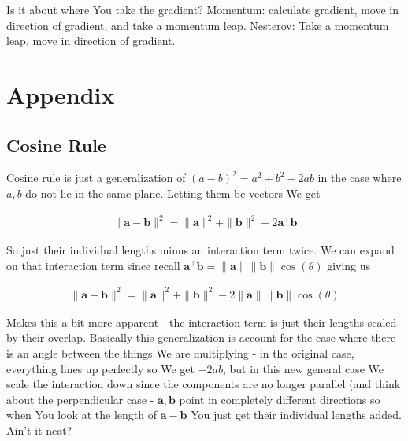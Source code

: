 \documentclass{article}
\begin{document}
		Is it about where You take the gradient? Momentum: calculate gradient, move in direction of gradient, and take a momentum leap. Nesterov: Take a momentum leap, move in direction of gradient.















		
\newpage
\section{Appendix}

	\subsection{Cosine Rule}
	
		Cosine rule is just a generalization of $(a-b)^2 = a^2 + b^2 - 2ab$ in the case where $a, b$ do not lie in the same plane. Letting them be vectors We get
		
		\begin{align*}
			\|\mathbf{a - b}\|^2 = \|\mathbf{a}\|^2 + \|\mathbf{b}\|^2 - 2\mathbf{a}^\top\mathbf{b} 
		\end{align*}
		
		So just their individual lengths minus an interaction term twice. We can expand on that interaction term since recall $\mathbf{a}^\top\mathbf{b} = \|\mathbf{a}\|\|\mathbf{b}\|\cos(\theta)$ giving us
		
		\begin{align*}
			\|\mathbf{a - b}\|^2 = \|\mathbf{a}\|^2 + \|\mathbf{b}\|^2 - 2\|\mathbf{a}\|\|\mathbf{b}\|\cos(\theta) 
		\end{align*}
		
		Makes this a bit more apparent - the interaction term is just their lengths scaled by their overlap. Basically this generalization is account for the case where there is an angle between the things We are multiplying - in the original case, everything lines up perfectly so We get $-2ab$, but in this new general case We scale the interaction down since the components are no longer parallel (and think about the perpendicular case - $\mathbf{a, b}$ point in completely different directions so when You look at the length of $\mathbf{a-b}$ You just get their individual lengths added. Ain't it neat?
\end{document}
